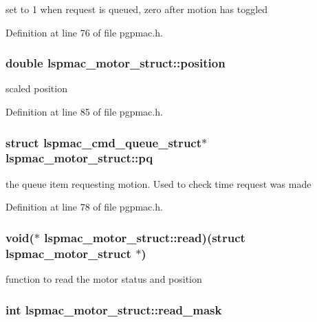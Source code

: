 set to 1 when request is queued, zero after motion has toggled 

Definition at line 76 of file pgpmac.h.\hypertarget{structlspmac__motor__struct_af8ffb3aed907d8664b65b37601954411}{
\subsubsection[{position}]{\setlength{\rightskip}{0pt plus 5cm}double {\bf lspmac\_\-motor\_\-struct::position}}}
\label{structlspmac__motor__struct_af8ffb3aed907d8664b65b37601954411}


scaled position 

Definition at line 85 of file pgpmac.h.\hypertarget{structlspmac__motor__struct_ae0a0c9264f49f51bf72168c3b62f8723}{
\subsubsection[{pq}]{\setlength{\rightskip}{0pt plus 5cm}struct {\bf lspmac\_\-cmd\_\-queue\_\-struct}$\ast$ {\bf lspmac\_\-motor\_\-struct::pq}}}
\label{structlspmac__motor__struct_ae0a0c9264f49f51bf72168c3b62f8723}


the queue item requesting motion. Used to check time request was made 

Definition at line 78 of file pgpmac.h.\hypertarget{structlspmac__motor__struct_ac62692eb939c04ca35e939d1c3acfe8f}{
\subsubsection[{read}]{\setlength{\rightskip}{0pt plus 5cm}void($\ast$ {\bf lspmac\_\-motor\_\-struct::read})(struct {\bf lspmac\_\-motor\_\-struct} $\ast$)}}
\label{structlspmac__motor__struct_ac62692eb939c04ca35e939d1c3acfe8f}


function to read the motor status and position \hypertarget{structlspmac__motor__struct_a3c24ed30c5a3ad490c6139b2780b2af7}{
\subsubsection[{read\_\-mask}]{\setlength{\rightskip}{0pt plus 5cm}int {\bf lspmac\_\-motor\_\-struct::read\_\-mask}}}
\label{structlspmac__motor__struct_a3c24ed30c5a3ad490c6139b2780b2af7}


